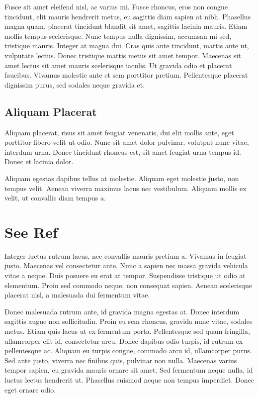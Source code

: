 \documentclass{article}
\begin{document}
Fusce sit amet eleifend nisl, ac varius mi. 
Fusce rhoncus, eros non congue tincidunt, elit mauris hendrerit metus, eu sagittis diam sapien at nibh. 
Phasellus magna quam, placerat tincidunt blandit sit amet, sagittis lacinia mauris. 
Etiam mollis tempus scelerisque. 
Nunc tempus nulla dignissim, accumsan mi sed, tristique mauris. 
Integer at magna dui. 
Cras quis ante tincidunt, mattis ante ut, vulputate lectus. 
Donec tristique mattis metus sit amet tempor. 
Maecenas sit amet lectus sit amet mauris scelerisque iaculis. 
Ut gravida odio et placerat faucibus. 
Vivamus molestie ante et sem porttitor pretium. 
Pellentesque placerat dignissim purus, sed sodales neque gravida et.

\subsection{Aliquam Placerat}
Aliquam placerat, risus sit amet feugiat venenatis, dui elit mollis ante, eget porttitor libero velit ut odio. 
Nunc sit amet dolor pulvinar, volutpat nunc vitae, interdum urna. 
Donec tincidunt rhoncus est, sit amet feugiat urna tempus id. 
Donec et lacinia dolor.


Aliquam egestas dapibus tellus at molestie. 
Aliquam eget molestie justo, non tempus velit. 
Aenean viverra maximus lacus nec vestibulum. 
Aliquam mollis ex velit, ut convallis diam tempus a.

\newpage

\section{See Ref}
Integer luctus rutrum lacus, nec convallis mauris pretium a. 
Vivamus \cite{knuth-fa} in feugiat justo. 
Maecenas vel consectetur ante. 
Nunc a sapien nec massa \cite{knuthwebsite} gravida vehicula vitae a neque. 
Duis posuere eu erat at tempor. 
Suspendisse tristique ut odio at elementum. 
Proin sed commodo neque, non consequat sapien. 
Aenean scelerisque placerat nisl, a malesuada dui fermentum vitae.


Donec malesuada rutrum ante, id gravida magna egestas at. 
Donec interdum sagittis augue non sollicitudin. 
Proin eu sem rhoncus, gravida nunc vitae, sodales metus. 
Etiam quis lacus ut ex \cite{einstein} fermentum porta. 
Pellentesque sed quam fringilla, ullamcorper elit id, consectetur arcu. 
Donec dapibus odio turpis, id rutrum ex pellentesque ac. 
Aliquam eu turpis congue, commodo arcu id, ullamcorper purus. 
Sed ante \cite{dirac}\cite{einstein} justo, viverra nec finibus quis, pulvinar non nulla. 
Maecenas varius tempor sapien, eu gravida mauris ornare sit amet. 
Sed fermentum neque nulla, id luctus lectus hendrerit ut. 
Phasellus euismod neque non tempus imperdiet. 
Donec eget ornare odio.

\newpage
\printbibliography
\end{document}
